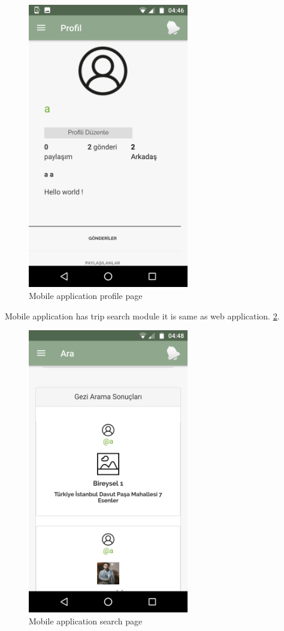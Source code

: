 \begin{figure}[!htbp]
\centering
\includegraphics[width=70mm,scale=0.7]{projectChapters/images/profileMobile.png}
\caption{Mobile application profile page}
\label{fig:profileMobile}
\end{figure}

\newpage

Mobile application has trip search module it is same as web application.
\ref{fig:mobilGeziArama}.

\begin{figure}[!htbp]
\centering
\includegraphics[width=70mm,scale=0.7]{projectChapters/images/mobilGeziArama.png}
\caption{Mobile application search page}
\label{fig:mobilGeziArama}
\end{figure}


